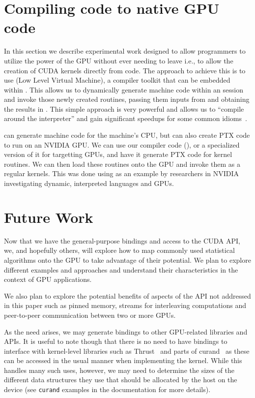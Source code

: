 \documentclass[article]{jss}
\def\R{\proglang{R}}
\def\llvm{\proglang{LLVM}}
\def\Rpkg#1{\pkg{#1}}
\begin{document}
\section[Compiling R code to native GPU code]{Compiling \R{} code to native GPU code}\label{sec:LLVM}
In this section we describe experimental work designed to 
allow programmers to utilize the power of the GPU without
ever needing to leave \R{} i.e., to allow the creation of CUDA
kernels directly from \R{} code. The approach to achieve this
is to use \llvm{} (Low Level Virtual Machine), a compiler toolkit 
that can be embedded within \R. 
This allows us to dynamically generate machine code within an \R{}
session and invoke those newly created routines, passing them 
inputs from \R{} and obtaining the results in \R.
This simple approach is very powerful and allows us to ``compile around the \R{}
interpreter'' and gain significant speedups for some common \R{}
idioms~\citep{bib:StatSciLLVM}.

\llvm{} can generate machine code for the machine's CPU, but can also
create PTX code to run on an NVIDIA GPU.  We can use our \R{} compiler
code (\Rpkg{RLLVMCompile}), or a specialized version of it for
targetting GPUs, and have it generate PTX code for kernel routines.
We can then load these routines onto the GPU and invoke them as a
regular kernels.  This was done using \R{} as an example by
researchers in NVIDIA~\citep{bib:libNVVM} investigating dynamic, interpreted
languages and GPUs.


\section{Future Work}

Now that we have the general-purpose bindings and access to the CUDA
API, we, and hopefully others, will explore how to map commonly used
statistical algorithms onto the GPU to take advantage of their potential.  
We plan to explore different examples and approaches and understand their
characteristics in the context of GPU applications.  

We also plan to explore the potential benefits of aspects of the API
not addressed in this paper such as pinned memory, streams for
interleaving computations and peer-to-peer communication between 
two or more GPUs.

As the need arises, we may generate bindings to other GPU-related
libraries and APIs. It is useful to note though that there is no need to have \R{}
bindings to interface with kernel-level libraries such as
Thrust~\citep{bib:Thrust} and parts of curand~\citep{bib:curand} as 
these can be accessed in the usual manner when implementing the kernel.
While this handles many such uses, however, we may need to determine
the sizes of the different data structures they use that should be allocated
by the host on the device (see \texttt{curand} examples in the \Rpkg{RCUDA}
documentation for more details).


\end{document}
